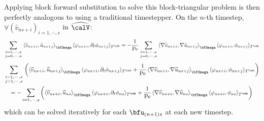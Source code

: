 \begin{example}
        Applying block forward substitution to solve this block-triangular problem is then perfectly analogous to using a traditional timestepper. On the $n$-th timestep, $\forall  \left(\widehat{v}_{ns + i}\right)_{i = 1, \cdots, s}$ in $\widehat{\calV}$:
        \begin{equation}
            \sum_{\begin{smallmatrix}  i = 1, \cdots, s  \\  j = 0, \cdots, s  \end{smallmatrix}}\left\langle\widehat{v}_{ns + i}, \widehat{u}_{ns + j}\right\rangle_{\bfOmega}\langle\varphi_{ns + i}, \partial_{t}\phi_{ns + j}\rangle_{T^{\rmh}}  =  - \frac{1}{\rmPe}\sum_{\begin{smallmatrix}  i = 1, \cdots, s  \\  j = 0, \cdots, s  \end{smallmatrix}}\left\langle\nabla\widehat{v}_{ns + i}, \nabla\widehat{u}_{ns + j}\right\rangle_{\bfOmega}\langle\varphi_{ns + i}, \phi_{ns + j}\rangle_{T^{\rmh}}
        \end{equation}
        \begin{multline}
            \sum_{\begin{smallmatrix}  i = 1, \cdots, s  \\  j = 1, \cdots, s  \end{smallmatrix}}\left(\left\langle\widehat{v}_{ns + i}, \widehat{u}_{ns + j}\right\rangle_{\bfOmega}\langle\varphi_{ns + i}, \partial_{t}\phi_{ns + j}\rangle_{T^{\rmh}} + \frac{1}{\rmPe}\left\langle\nabla\widehat{v}_{ns + i}, \nabla\widehat{u}_{ns + j}\right\rangle_{\bfOmega}\langle\varphi_{ns + i}, \phi_{ns + j}\rangle_{T^{\rmh}}\right)  \\
            =  - \sum_{i = 1, \cdots, s}\left(\left\langle\widehat{v}_{ns + i}, \widehat{u}_{ns}\right\rangle_{\bfOmega}\langle\varphi_{ns + i}, \partial_{t}\phi_{ns}\rangle_{T^{\rmh}} + \frac{1}{\rmPe}\left\langle\nabla\widehat{v}_{ns + i}, \nabla\widehat{u}_{ns}\right\rangle_{\bfOmega}\langle\varphi_{ns + i}, \phi_{ns}\rangle_{T^{\rmh}}\right)
        \end{multline}
        which can be solved iteratively for each $\bfu_{(n + 1)s}$ at each new timestep.


\end{example}
